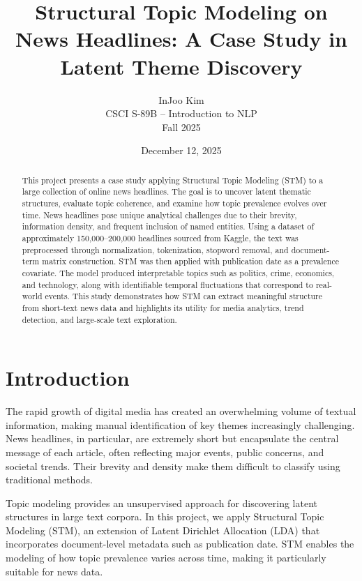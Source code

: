 \documentclass[11pt]{article}
\title{\textbf{Structural Topic Modeling on News Headlines: A Case Study in Latent Theme Discovery}}
\author{InJoo Kim \\ CSCI S-89B – Introduction to NLP \\ Fall 2025}
\date{December 12, 2025}
\begin{document}
\maketitle

\begin{abstract}
This project presents a case study applying Structural Topic Modeling (STM) to a large collection of online news headlines. The goal is to uncover latent thematic structures, evaluate topic coherence, and examine how topic prevalence evolves over time. News headlines pose unique analytical challenges due to their brevity, information density, and frequent inclusion of named entities. Using a dataset of approximately 150,000--200,000 headlines sourced from Kaggle, the text was preprocessed through normalization, tokenization, stopword removal, and document-term matrix construction. STM was then applied with publication date as a prevalence covariate. The model produced interpretable topics such as politics, crime, economics, and technology, along with identifiable temporal fluctuations that correspond to real-world events. This study demonstrates how STM can extract meaningful structure from short-text news data and highlights its utility for media analytics, trend detection, and large-scale text exploration.
\end{abstract}

\section{Introduction}

The rapid growth of digital media has created an overwhelming volume of textual information, making manual identification of key themes increasingly challenging. News headlines, in particular, are extremely short but encapsulate the central message of each article, often reflecting major events, public concerns, and societal trends. Their brevity and density make them difficult to classify using traditional methods.

Topic modeling provides an unsupervised approach for discovering latent structures in large text corpora. In this project, we apply Structural Topic Modeling (STM), an extension of Latent Dirichlet Allocation (LDA) that incorporates document-level metadata such as publication date. STM enables the modeling of how topic prevalence varies across time, making it particularly suitable for news data.
\end{document}
